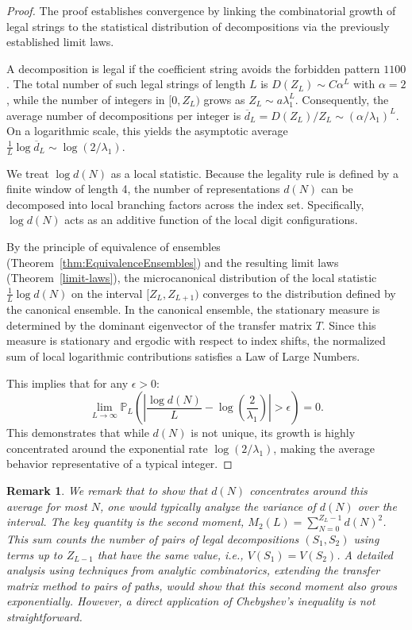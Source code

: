 \documentclass[11pt]{amsart}
\theoremstyle{plain}
\numberwithin{equation}{section} %
\newtheorem{remark}[thm]{Remark}
\numberwithin{table}{section} %
\numberwithin{figure}{section}
\begin{document}
	\begin{proof}
		The proof establishes convergence by linking the combinatorial growth of legal strings to the statistical distribution of decompositions via the previously established limit laws.
		
		A decomposition is legal if the coefficient string avoids the forbidden pattern $1100$. The total number of such legal strings of length $L$ is $D(Z_{L}) \sim C \alpha^{L}$ with $\alpha=2$, while the number of integers in $[0, Z_L)$ grows as $Z_L \sim a \lambda_1^L$. Consequently, the average number of decompositions per integer is $\overline{d}_L = D(Z_L)/Z_L \sim (\alpha/\lambda_1)^L$. On a logarithmic scale, this yields the asymptotic average $\frac{1}{L} \log \overline{d}_L \sim \log(2/\lambda_1)$.
		
		We treat $\log d(N)$ as a local statistic. Because the legality rule is defined by a finite window of length 4, the number of representations $d(N)$ can be decomposed into local branching factors across the index set. Specifically, $\log d(N)$ acts as an additive function of the local digit configurations.
		
		By the principle of equivalence of ensembles (Theorem~\ref{thm:EquivalenceEnsembles}) and the resulting limit laws (Theorem~\ref{limit-laws}), the microcanonical distribution of the local statistic $\frac{1}{L} \log d(N)$ on the interval $[Z_L, Z_{L+1})$ converges to the distribution defined by the canonical ensemble. In the canonical ensemble, the stationary measure is determined by the dominant eigenvector of the transfer matrix $T$. Since this measure is stationary and ergodic with respect to index shifts, the normalized sum of local logarithmic contributions satisfies a Law of Large Numbers. 
		
		This implies that for any $\epsilon > 0$:
		\[
		\lim_{L \to \infty} \mathbb{P}_L \left( \left| \frac{\log d(N)}{L} - \log\left(\frac{2}{\lambda_1}\right) \right| > \epsilon \right) = 0.
		\]
		This demonstrates that while $d(N)$ is not unique, its growth is highly concentrated around the exponential rate $\log(2/\lambda_1)$, making the average behavior representative of a typical integer.
	\end{proof}
	
	
	
	
	\begin{remark}
		We remark that  to show that $d(N)$ concentrates around this average for most $N$, one would typically analyze the variance of $d(N)$ over the interval. The key quantity is the second moment, $M_2(L) = \sum_{N=0}^{Z_L-1} d(N)^2$. This sum counts the number of pairs of legal decompositions $(S_1, S_2)$ using terms up to $Z_{L-1}$ that have the same value, i.e., $V(S_1) = V(S_2)$. A detailed analysis using techniques from analytic combinatorics, extending the transfer matrix method to pairs of paths, would show that this second moment also grows exponentially. However, a direct application of Chebyshev's inequality is not straightforward.	
	\end{remark}
	
\end{document}
